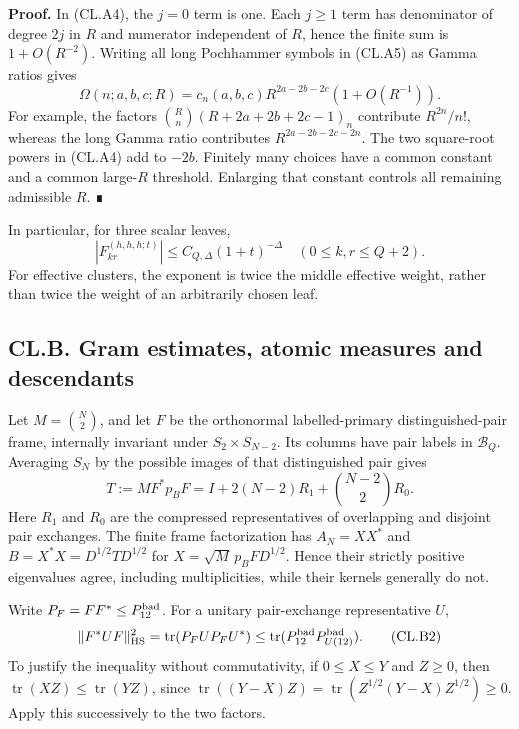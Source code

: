 \documentclass[a4paper,11pt]{article}
\numberwithin{equation}{section}
\begin{document}
\textbf{Proof.} In (CL.A4), the \(j=0\) term is one. Each \(j\geq1\) term has denominator of degree \(2j\) in \(R\) and numerator independent of \(R\), hence the finite sum is \(1+O(R^{-2})\). Writing all long Pochhammer symbols in (CL.A5) as Gamma ratios gives \[
\Omega(n;a,b,c;R)
=c_n(a,b,c)R^{2a-2b-2c}(1+O(R^{-1})).
\] For example, the factors \(\binom Rn(R+2a+2b+2c-1)_n\) contribute \(R^{2n}/n!\), whereas the long Gamma ratio contributes \(R^{2a-2b-2c-2n}\). The two square-root powers in (CL.A4) add to \(-2b\). Finitely many choices have a common constant and a common large-\(R\) threshold. Enlarging that constant controls all remaining admissible \(R\). ∎

In particular, for three scalar leaves, \[
|F_{kr}^{(h,h,h;t)}|\leq C_{Q,\Delta}(1+t)^{-\Delta}
\quad(0\leq k,r\leq Q+2).
\tag{CL.A8}
\] For effective clusters, the exponent is twice the middle effective weight, rather than twice the weight of an arbitrarily chosen leaf.

\hypertarget{cl.b.-gram-estimates-atomic-measures-and-descendants}{%
\subsection{CL.B. Gram estimates, atomic measures and descendants}\label{cl.b.-gram-estimates-atomic-measures-and-descendants}}

Let \(M=\binom N2\), and let \(F\) be the orthonormal labelled-primary distinguished-pair frame, internally invariant under \(S_2\times S_{N-2}\). Its columns have pair labels in \(\mathcal B_Q\). Averaging \(S_N\) by the possible images of that distinguished pair gives \[
T:=MF^*p_BF=I+2(N-2)R_1+\binom{N-2}{2}R_0.
\tag{CL.B1}
\] Here \(R_1\) and \(R_0\) are the compressed representatives of overlapping and disjoint pair exchanges. The finite frame factorization has \(A_N=XX^*\) and \(B=X^*X=D^{1/2}TD^{1/2}\) for \(X=\sqrt M\,p_BFD^{1/2}\). Hence their strictly positive eigenvalues agree, including multiplicities, while their kernels generally do not.

Write \(P_F=FF^*\leq P_{12}^{\rm bad}\). For a unitary pair-exchange representative \(U\), \[
\|F^*UF\|_{\rm HS}^2
=\operatorname{tr}(P_FUP_FU^*)
\leq\operatorname{tr}(P_{12}^{\rm bad}P_{U(12)}^{\rm bad}).
\tag{CL.B2}
\] To justify the inequality without commutativity, if \(0\leq X\leq Y\) and \(Z\geq0\), then \(\operatorname{tr}(XZ)\leq\operatorname{tr}(YZ)\), since \(\operatorname{tr}((Y-X)Z)=\operatorname{tr}(Z^{1/2}(Y-X)Z^{1/2})\geq0\). Apply this successively to the two factors.
\end{document}
